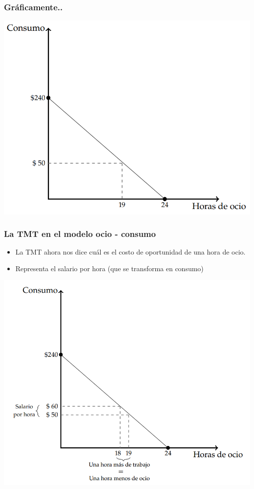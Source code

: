 \documentclass{beamer}
\begin{document}
\begin{frame}
  \frametitle{Gráficamente..}
  \begin{center}
    \includegraphics[scale=0.5]{../Figures/C9.1.png}
  \end{center}
\end{frame}

\begin{frame}
  \frametitle{La TMT en el modelo ocio - consumo}
  \begin{itemize}
    \item La TMT ahora nos dice cuál es el costo de oportunidad de una hora de ocio.
    \item Representa el salario por hora (que se transforma en consumo)
  \end{itemize}
  \begin{center}
    \includegraphics[scale=0.35]{../Figures/C9.2.png}
  \end{center}
\end{frame}
\end{document}

